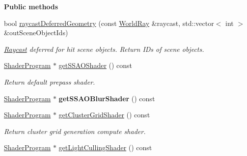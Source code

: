 \begin{Indent}\textbf{ Public methods}\par
\begin{DoxyCompactItemize}
\item 
\mbox{\label{classrev_1_1_main_renderer_a3ef9e9df40fcaeea8e9e20b23664ed7a}} 
bool \mbox{\hyperlink{classrev_1_1_main_renderer_a3ef9e9df40fcaeea8e9e20b23664ed7a}{raycast\+Deferred\+Geometry}} (const \mbox{\hyperlink{classrev_1_1_world_ray}{World\+Ray}} \&raycast, std\+::vector$<$ int $>$ \&out\+Scene\+Object\+Ids)
\begin{DoxyCompactList}\small\item\em \mbox{\hyperlink{class_raycast}{Raycast}} deferred for hit scene objects. Return I\+Ds of scene objects. \end{DoxyCompactList}\item 
\mbox{\hyperlink{classrev_1_1_shader_program}{Shader\+Program}} $\ast$ \mbox{\hyperlink{classrev_1_1_main_renderer_a230ccdf12b276471661c9be6ebcb6ef6}{get\+S\+S\+A\+O\+Shader}} () const
\begin{DoxyCompactList}\small\item\em Return default prepass shader. \end{DoxyCompactList}\item 
\mbox{\label{classrev_1_1_main_renderer_a60b029e641bfc2f8f88a1501c77af3cb}} 
\mbox{\hyperlink{classrev_1_1_shader_program}{Shader\+Program}} $\ast$ {\bfseries get\+S\+S\+A\+O\+Blur\+Shader} () const
\item 
\mbox{\label{classrev_1_1_main_renderer_a54392fc6843ff51f839c0b78dcaab69a}} 
\mbox{\hyperlink{classrev_1_1_shader_program}{Shader\+Program}} $\ast$ \mbox{\hyperlink{classrev_1_1_main_renderer_a54392fc6843ff51f839c0b78dcaab69a}{get\+Cluster\+Grid\+Shader}} () const
\begin{DoxyCompactList}\small\item\em Return cluster grid generation compute shader. \end{DoxyCompactList}\item 
\mbox{\label{classrev_1_1_main_renderer_a48ec5f456a659794b6ba347f6421b865}} 
\mbox{\hyperlink{classrev_1_1_shader_program}{Shader\+Program}} $\ast$ \mbox{\hyperlink{classrev_1_1_main_renderer_a48ec5f456a659794b6ba347f6421b865}{get\+Light\+Culling\+Shader}} () const

\end{DoxyCompactItemize}
\end{Indent}
